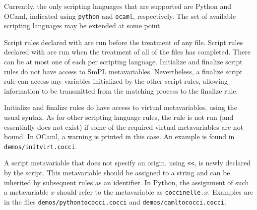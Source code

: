 \begin{grammar}

    


\end{grammar}

Currently, the only scripting languages that are supported are Python and
OCaml, indicated using {\tt python} and {\tt ocaml}, respectively.  The
set of available scripting languages may be extended at some point.

Script rules declared with  are run before the treatment of
any file.  Script rules declared with  are run when the
treatment of all of the files has completed.  There can be at most one of
each per scripting language.
Initialize and finalize script rules do not have access to SmPL
metavariables.  Nevertheless, a finalize script rule can access any
variables initialized by the other script rules, allowing information to be
transmitted from the matching process to the finalize rule.

Initialize and finalize rules do have access to virtual metavariables,
using the usual syntax.  As for other scripting language rules, the rule
is not run (and essentially does not exist) if some of the required virtual
metavariables are not bound.  In OCaml, a warning is printed in this case.
An example is found in {\tt demos/initvirt.cocci}.

A script metavariable that does not specify an origin, using \texttt{<<},
is newly declared by the script.  This metavariable should be assigned to a
string and can be inherited by subsequent rules as an identifier.  In
Python, the assignment of such a metavariable $x$ should refer to the
metavariable as {\tt coccinelle.\(x\)}.  Examples are in the files
\texttt{demos/pythontococci.cocci} and \texttt{demos/camltococci.cocci}.

